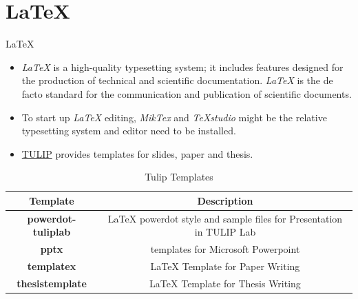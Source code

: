 \documentclass[
 size=12pt,
 paper=smartboard, %
 mode=present, %
 display=slides, %
style=tuliplab,
pauseslide,
fleqn,leqno]{powerdot}
\begin{document}
\section{\LaTeX~}
\begin{slide}[toc=,bm=]{\LaTeX~}
	\begin{itemize}
		\item \textit{\LaTeX} is a high-quality typesetting system; 
		it includes features designed for the production of technical and 
		scientific documentation. 
		\textit{\LaTeX} is the de facto standard for the communication and publication of 
		scientific documents. \\
		\item To start up \textit{\LaTeX} editing, 
		\textit{MikTex} and \textit{TeXstudio} might be the relative typesetting system and editor need to be 
		installed.\\
		\item \textcolor{orange}{\faGithub}\href{https://github.com/tulip-lab/templatex}{TULIP}
		provides templates for slides, 
		paper and thesis.
	\end{itemize}
%	
%

	 
	 \begin{table}
	 	\caption{Tulip Templates}
	 	\begin{tabular}{|c|c|}
	 		\toprule
	 		\textbf{Template}  & \textbf{Description} \\
	 		\midrule
	 		\textbf{powerdot-tuliplab} & LaTeX powerdot style and sample files for Presentation in TULIP Lab\\
	 		\textbf{pptx} & templates for Microsoft Powerpoint \\
	 		\textbf{templatex} & LaTeX Template for Paper Writing \\
	 		\textbf{thesistemplate} & LaTeX Template for Thesis Writing \\
	 		\bottomrule
	 	\end{tabular}
	 \end{table}

\end{slide}
\end{document}
